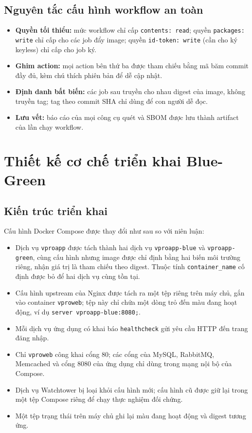\documentclass[12pt,a4paper,oneside]{extreport}
\begin{document}
\subsection{Nguyên tắc cấu hình workflow an toàn}
\begin{itemize}
  \item \textbf{Quyền tối thiểu:} mức workflow chỉ cấp \texttt{contents: read};
  quyền \texttt{packages: write} chỉ cấp cho các job đẩy image; quyền
  \texttt{id-token: write} (cần cho ký keyless) chỉ cấp cho job ký.
  \item \textbf{Ghim action:} mọi action bên thứ ba được tham chiếu bằng mã băm
  commit đầy đủ, kèm chú thích phiên bản để dễ cập nhật.
  \item \textbf{Định danh bất biến:} các job sau truyền cho nhau digest của image,
  không truyền tag; tag theo commit SHA chỉ dùng để con người dễ đọc.
  \item \textbf{Lưu vết:} báo cáo của mọi công cụ quét và SBOM được lưu thành
  artifact của lần chạy workflow.
\end{itemize}

\section{Thiết kế cơ chế triển khai Blue-Green}
\label{sec:bluegreen-design}
\subsection{Kiến trúc triển khai}
Cấu hình Docker Compose được thay đổi như sau so với niên luận:
\begin{itemize}
  \item Dịch vụ \texttt{vproapp} được tách thành hai dịch vụ \texttt{vproapp-blue}
  và \texttt{vproapp-green}, cùng cấu hình nhưng image được chỉ định bằng hai
  biến môi trường riêng, nhận giá trị là tham chiếu theo digest. Thuộc tính
  \texttt{container\_name} cố định được bỏ để hai dịch vụ cùng tồn tại.
  \item Cấu hình upstream của Nginx được tách ra một tệp riêng trên máy chủ,
  gắn vào container \texttt{vproweb}; tệp này chỉ chứa một dòng trỏ đến màu
  đang hoạt động, ví dụ \texttt{server vproapp-blue:8080;}.
  \item Mỗi dịch vụ ứng dụng có khai báo \texttt{healthcheck} gửi yêu cầu HTTP
  đến trang đăng nhập.
  \item Chỉ \texttt{vproweb} công khai cổng 80; các cổng của MySQL, RabbitMQ,
  Memcached và cổng 8080 của ứng dụng chỉ dùng trong mạng nội bộ của Compose.
  \item Dịch vụ Watchtower bị loại khỏi cấu hình mới; cấu hình cũ được giữ lại
  trong một tệp Compose riêng để chạy thực nghiệm đối chứng.
  \item Một tệp trạng thái trên máy chủ ghi lại màu đang hoạt động và digest
  tương ứng.
\end{itemize}
\end{document}
